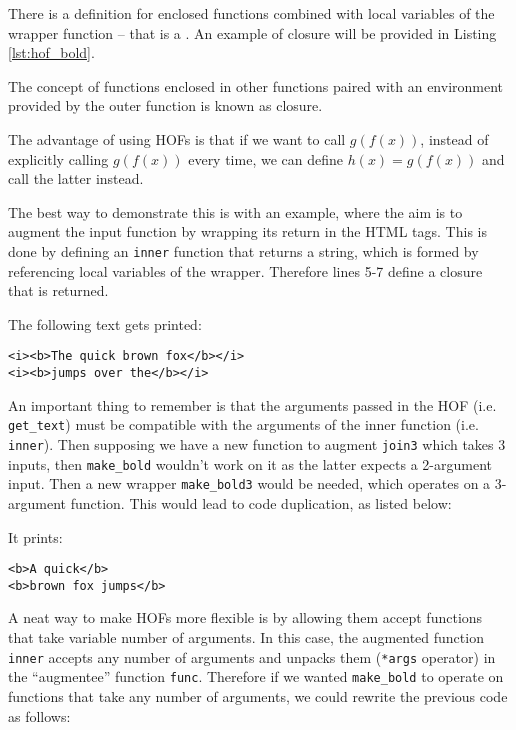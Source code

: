 \documentclass[a4paper]{article}
\begin{document}
There is a definition for enclosed functions combined with local variables of the wrapper function -- that is a . An example of closure will be provided in Listing \ref{lst:hof_bold}.
\begin{definition}[closure]
The concept of functions enclosed in other functions paired with an environment provided 
by the outer function is known as closure. 
\end{definition}

The advantage of using HOFs is that if we want to call $g(f(x))$, instead of explicitly calling $g(f(x))$ every time, we can define $h(x) = g(f(x))$ and call the latter instead. 

The best way to demonstrate this is with an example, where the aim is to augment the input function by wrapping its return in the  HTML tags. This is done by defining an \texttt{inner} function that returns a string, which is formed by referencing local variables of the wrapper. Therefore lines 5-7 define a closure that is returned.


The following text gets printed:
\begin{verbatim}
<i><b>The quick brown fox</b></i>
<i><b>jumps over the</b></i>
\end{verbatim}
An important thing to remember is that the arguments passed in the HOF (i.e. \texttt{get\_text}) must be compatible with the arguments of the inner function (i.e. \texttt{inner}). Then supposing we have a new function to augment \texttt{join3} which takes 3 inputs, then \texttt{make\_bold} wouldn't work on it as the latter expects a 2-argument input. Then a new wrapper \texttt{make\_bold3} would be needed, which operates on a 3-argument function. This would lead to code duplication, as listed below:

It prints:
\begin{verbatim}
<b>A quick</b>
<b>brown fox jumps</b>
\end{verbatim}

A neat way to make HOFs more flexible is by allowing them accept functions that take variable number of arguments. In this case, the augmented function \texttt{inner} accepts any number of arguments and unpacks them (\texttt{*args} operator) in the ``augmentee'' function \texttt{func}. Therefore if we wanted \texttt{make\_bold} to operate on functions that take any number of arguments, we could rewrite the previous code as follows:

\end{document}
